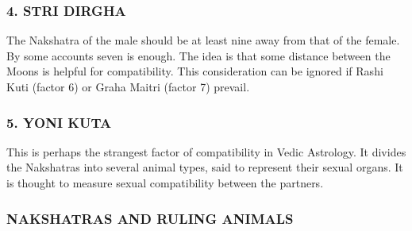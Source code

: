  

\subsubsection{4. STRI DIRGHA}
 

The Nakshatra of the male should be at least nine away from that of the female. By some accounts seven is enough. The idea is that some distance between the Moons is helpful for compatibility. This consideration can be ignored if Rashi Kuti (factor 6) or Graha Maitri (factor 7) prevail.

 

\subsubsection{5. YONI KUTA}
 

This is perhaps the strangest factor of compatibility in Vedic Astrology. It divides the Nakshatras into several animal types, said to represent their sexual organs. It is thought to measure sexual compatibility between the partners.

 

\subsubsection{NAKSHATRAS AND RULING ANIMALS}

